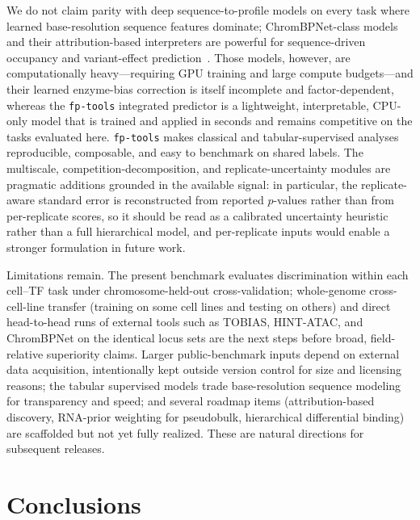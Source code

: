 \documentclass[biomedinformatics,article,submit,pdftex,moreauthors]{Definitions/mdpi}
\begin{document}
We do not claim parity with deep sequence-to-profile models on every task where
learned base-resolution sequence features dominate; ChromBPNet-class models and
their attribution-based interpreters are powerful for sequence-driven occupancy and
variant-effect prediction~\cite{chrombpnet2024}. Those models, however, are
computationally heavy---requiring GPU training and large compute budgets---and
their learned enzyme-bias correction is itself incomplete and factor-dependent,
whereas the \texttt{fp-tools} integrated predictor is a lightweight, interpretable,
CPU-only model that is trained and applied in seconds and remains competitive on
the tasks evaluated here. \texttt{fp-tools} makes classical and tabular-supervised
analyses reproducible, composable, and easy to benchmark on shared labels. The
multiscale, competition-decomposition, and replicate-uncertainty modules are
pragmatic additions grounded in the available signal: in particular, the
replicate-aware standard error is reconstructed from reported $p$-values rather
than from per-replicate scores, so it should be read as a calibrated uncertainty
heuristic rather than a full hierarchical model, and per-replicate inputs would
enable a stronger formulation in future work.

Limitations remain. The present benchmark evaluates discrimination within each
cell--TF task under chromosome-held-out cross-validation; whole-genome
cross-cell-line transfer (training on some cell lines and testing on others) and
direct head-to-head runs of external tools such as TOBIAS, HINT-ATAC, and
ChromBPNet on the identical locus sets are the next steps before broad,
field-relative superiority claims. Larger public-benchmark inputs depend on
external data acquisition, intentionally kept outside version control for size and
licensing reasons; the tabular supervised models trade base-resolution sequence
modeling for transparency and speed; and several roadmap items (attribution-based
discovery, RNA-prior weighting for pseudobulk, hierarchical differential binding)
are scaffolded but not yet fully realized. These are natural directions for
subsequent releases.

\section{Conclusions}
\end{document}
